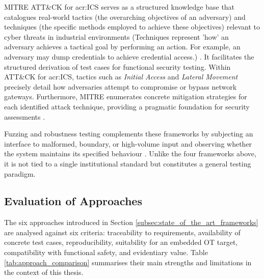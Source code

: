 MITRE ATT\&CK for \gls{acr:ICS} serves as a structured knowledge base that catalogues real-world tactics (the overarching objectives of an adversary) and techniques (the specific methods employed to achieve these objectives) relevant to cyber threats in industrial environments (Techniques represent 'how' an adversary achieves a tactical goal by performing an action. For example, an adversary may dump credentials to achieve credential access.) \cite{mitre_attack_ics}. It facilitates the structured derivation of test cases for functional security testing. Within ATT\&CK for \gls{acr:ICS}, tactics such as \textit{Initial Access} and \textit{Lateral Movement} precisely detail how adversaries attempt to compromise or bypass network gateways. Furthermore, MITRE enumerates concrete mitigation strategies for each identified attack technique, providing a pragmatic foundation for security assessments \cite{mitre_attack_ics_tactics}. 

Fuzzing and robustness testing complements these frameworks by subjecting an interface to malformed, boundary, or high-volume input and observing whether the system maintains its specified behaviour \cite[p. 29]{richier2011security}. Unlike the four frameworks above, it is not tied to a single institutional standard but constitutes a general testing paradigm. 

\subsection{Evaluation of Approaches} 
\label{subsec:approach_evaluation} 

The six approaches introduced in Section \ref{subsec:state_of_the_art_frameworks} are analysed against six criteria: traceability to requirements, availability of concrete test cases, reproducibility, suitability for an embedded OT target, compatibility with functional safety, and evidentiary value. Table \ref{tab:approach_comparison} summarises their main strengths and limitations in the context of this thesis. 

